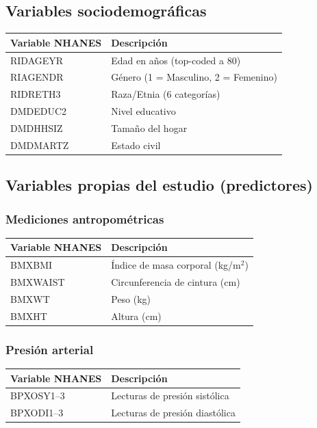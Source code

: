 \documentclass[12pt, a4paper]{report}
\begin{document}
\subsection{Variables sociodemográficas}

\begin{table}[H]
\centering
\begin{tabular}{ll}
\toprule
\textbf{Variable NHANES} & \textbf{Descripción} \\
\midrule
RIDAGEYR & Edad en años (top-coded a 80) \\
RIAGENDR & Género (1 = Masculino, 2 = Femenino) \\
RIDRETH3 & Raza/Etnia (6 categorías) \\
DMDEDUC2 & Nivel educativo \\
DMDHHSIZ & Tamaño del hogar \\
DMDMARTZ & Estado civil \\
\bottomrule
\end{tabular}
\end{table}

\subsection{Variables propias del estudio (predictores)}

\subsubsection{Mediciones antropométricas}

\begin{table}[H]
\centering
\begin{tabular}{ll}
\toprule
\textbf{Variable NHANES} & \textbf{Descripción} \\
\midrule
BMXBMI & Índice de masa corporal (kg/m$^2$) \\
BMXWAIST & Circunferencia de cintura (cm) \\
BMXWT & Peso (kg) \\
BMXHT & Altura (cm) \\
\bottomrule
\end{tabular}
\end{table}

\subsubsection{Presión arterial}

\begin{table}[H]
\centering
\begin{tabular}{ll}
\toprule
\textbf{Variable NHANES} & \textbf{Descripción} \\
\midrule
BPXOSY1--3 & Lecturas de presión sistólica \\
BPXODI1--3 & Lecturas de presión diastólica \\
\bottomrule
\end{tabular}
\end{table}
\end{document}
